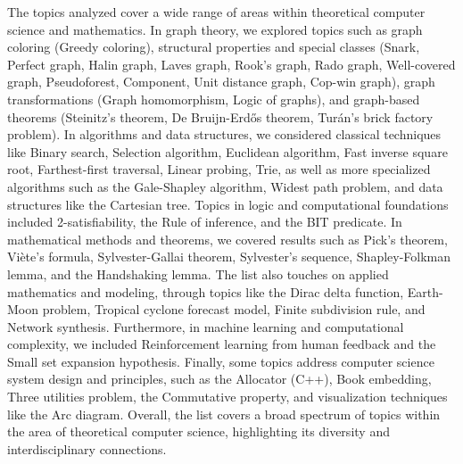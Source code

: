 The topics analyzed cover a wide range of areas within theoretical computer science and mathematics. In graph theory, we explored topics such as graph coloring (Greedy coloring), structural properties and special classes (Snark, Perfect graph, Halin graph, Laves graph, Rook's graph, Rado graph, Well-covered graph, Pseudoforest, Component, Unit distance graph, Cop-win graph), graph transformations (Graph homomorphism, Logic of graphs), and graph-based theorems (Steinitz's theorem, De Bruijn-Erdős theorem, Turán's brick factory problem). In algorithms and data structures, we considered classical techniques like Binary search, Selection algorithm, Euclidean algorithm, Fast inverse square root, Farthest-first traversal, Linear probing, Trie, as well as more specialized algorithms such as the Gale-Shapley algorithm, Widest path problem, and data structures like the Cartesian tree. Topics in logic and computational foundations included 2-satisfiability, the Rule of inference, and the BIT predicate. In mathematical methods and theorems, we covered results such as Pick's theorem, Viète's formula, Sylvester-Gallai theorem, Sylvester's sequence, Shapley-Folkman lemma, and the Handshaking lemma. The list also touches on applied mathematics and modeling, through topics like the Dirac delta function, Earth-Moon problem, Tropical cyclone forecast model, Finite subdivision rule, and Network synthesis. Furthermore, in machine learning and computational complexity, we included Reinforcement learning from human feedback and the Small set expansion hypothesis. Finally, some topics address computer science system design and principles, such as the Allocator (C++), Book embedding, Three utilities problem, the Commutative property, and visualization techniques like the Arc diagram. Overall, the list covers a broad spectrum of topics within the area of theoretical computer science, highlighting its diversity and interdisciplinary connections.

